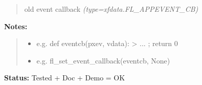 \begin{boxedminipage}{\funcwidth}
      \begin{quote}

old event callback
      {\it (type=xfdata.FL\_APPEVENT\_CB)}

      \end{quote}

\textbf{Notes:}
\begin{quote}
  \begin{itemize}

  \item
    \setlength{\parskip}{0.6ex}

e.g. def eventcb(pxev, vdata): > ... ; return 0


  \item 
e.g. fl\_set\_event\_callback(eventcb, None)


\end{itemize}

\end{quote}

\textbf{Status:} 
Tested + Doc + Demo = OK


    \end{boxedminipage}

    \label{xformslib:flxbasic:fl_set_idle_callback}

    \vspace{0.5ex}

